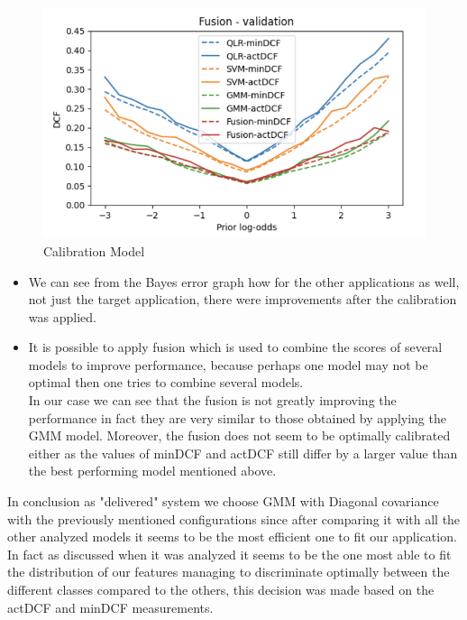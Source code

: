 \documentclass{article}
\begin{document}
\begin{figure}[H]
\begin{minipage}{.4\textwidth}
    \end{minipage}
    \begin{minipage}{.4\textwidth}
        \centering
        \includegraphics[width=\linewidth]{./img/Cal4.png}
    \end{minipage}
    \caption{Calibration Model} %
    \label{fig:CalMod} %
\end{figure}
\begin{itemize}
    \item We can see from the Bayes error graph how for the other applications as well, not just the target application, there were improvements after the calibration was applied.
    \item It is possible to apply fusion which is used to combine the scores of several models to improve performance, because perhaps one model may not be optimal then one tries to combine several models.\\In our case we can see that the fusion is not greatly improving the performance in fact they are very similar to those obtained by applying the GMM model. Moreover, the fusion does not seem to be optimally calibrated either as the values of minDCF and actDCF still differ by a larger value than the best performing model mentioned above.
\end{itemize}
In conclusion as "delivered" system we choose GMM with Diagonal covariance with the previously mentioned configurations since after comparing it with all the other analyzed models it seems to be the most efficient one to fit our application. In fact as discussed when it was analyzed it seems to be the one most able to fit the distribution of our features managing to discriminate optimally between the different classes compared to the others, this decision was made based on the actDCF and minDCF measurements.
\end{document}
